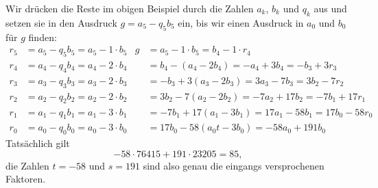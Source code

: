 \begin{beispiel}
Wir drücken die Reste im obigen Beispiel durch die Zahlen $a_k$, $b_k$ und
$q_k$ aus und setzen sie in den Ausdruck $g=a_5-q_5b_5$ ein, bis wir
einen Ausdruck in $a_0$ und $b_0$ für $g$ finden:
\[
\begin{aligned}
r_5&=a_5-q_5 b_5=a_5-1\cdot b_5& g &= a_5 - 1 \cdot b_5 = b_4 - 1 \cdot r_4
\\
r_4&=a_4-q_4 b_4=a_4-2\cdot b_4&   &= b_4 - (a_4 -2b_4) 
                                    = -a_4 +3b_4 = -b_3 + 3r_3
\\
r_3&=a_3-q_3 b_3=a_3-2\cdot b_3&   &= -b_3 + 3(a_3-2b_3)
                                    = 3a_3 - 7b_3 = 3b_2 -7r_2
\\
r_2&=a_2-q_2 b_2=a_2-2\cdot b_2&   &= 3b_2 -7(a_2-2b_2)
                                    = -7a_2 + 17b_2 = -7b_1 + 17r_1
\\
r_1&=a_1-q_1 b_1=a_1-3\cdot b_1&   &= -7b_1 + 17(a_1-3b_1)
                                    = 17a_1 - 58b_1 = 17 b_0 - 58 r_0
\\
r_0&=a_0-q_0 b_0=a_0-3\cdot b_0&   &= 17b_0 - 58(a_0t-3b_0)
                                    = -58a_0+191b_0
\end{aligned}
\]
Tatsächlich gilt
\[
-58\cdot 76415 + 191 \cdot 23205 = 85,
\]
die Zahlen $t=-58$ und $s=191$ sind also genau die eingangs versprochenen
Faktoren.
\end{beispiel}

%
%
